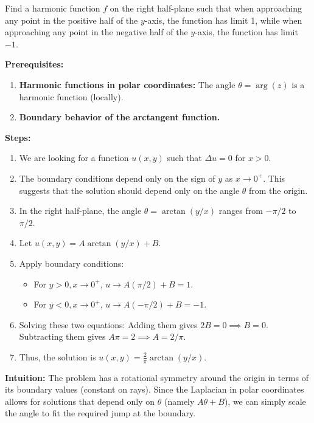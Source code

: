 \begin{exercise}
\label{analysis:2010:4}
Find a harmonic function $f$ on the right half-plane such that when approaching any point in the positive half of the $y$-axis, the function has limit 1, while when approaching any point in the negative half of the $y$-axis, the function has limit $-1$.
\end{exercise}

\begin{solution}
\textbf{Prerequisites:}
\begin{enumerate}
    \item \textbf{Harmonic functions in polar coordinates:} The angle $\theta = \arg(z)$ is a harmonic function (locally).
    \item \textbf{Boundary behavior of the arctangent function.}
\end{enumerate}

\textbf{Steps:}
\begin{enumerate}
    \item We are looking for a function $u(x, y)$ such that $\Delta u = 0$ for $x > 0$.
    \item The boundary conditions depend only on the sign of $y$ as $x \to 0^+$. This suggests that the solution should depend only on the angle $\theta$ from the origin.
    \item In the right half-plane, the angle $\theta = \arctan(y/x)$ ranges from $-\pi/2$ to $\pi/2$.
    \item Let $u(x, y) = A \arctan(y/x) + B$.
    \item Apply boundary conditions:
       \begin{itemize}
           \item For $y > 0, x \to 0^+$, $u \to A(\pi/2) + B = 1$.
           \item For $y < 0, x \to 0^+$, $u \to A(-\pi/2) + B = -1$.
       \end{itemize}
    \item Solving these two equations:
       Adding them gives $2B = 0 \implies B = 0$.
       Subtracting them gives $A\pi = 2 \implies A = 2/\pi$.
    \item Thus, the solution is $u(x, y) = \frac{2}{\pi} \arctan(y/x)$.
\end{enumerate}

\textbf{Intuition:}
The problem has a rotational symmetry around the origin in terms of its boundary values (constant on rays). Since the Laplacian in polar coordinates allows for solutions that depend only on $\theta$ (namely $A\theta + B$), we can simply scale the angle to fit the required jump at the boundary.
\end{solution}


